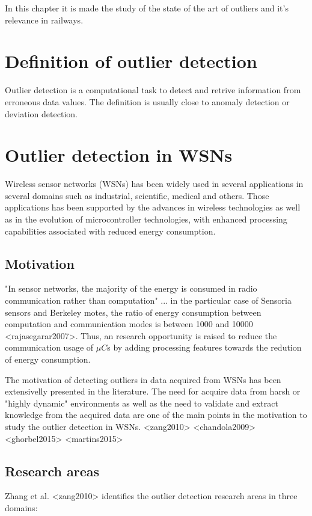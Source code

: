 In this chapter it is  made the study of the state of the art of outliers and it's relevance in railways.


\section{Definition of outlier detection}

Outlier detection is a computational task to detect and retrive information from erroneous data values. The definition is usually close to anomaly detection or deviation detection. 


\section{Outlier detection in WSNs}

Wireless sensor networks (WSNs) has been widely used in several applications in several domains such as industrial, scientific, medical and others. Those applications has been supported by the advances in wireless technologies as well as in the evolution of microcontroller technologies, with enhanced processing capabilities associated with reduced energy consumption.

\subsection{Motivation}

"In sensor networks, the majority of the energy is consumed in radio communication rather than computation" ... in the particular case of Sensoria sensors and Berkeley motes, the ratio of energy consumption between computation and communication modes is between 1000 and 10000 <rajasegarar2007>. Thus, an research opportunity is raised to reduce the communication usage of $\mu C$s by adding processing features towards the redution of energy consumption.

The motivation of detecting outliers in data acquired from WSNs has been extensivelly presented in the literature. The need for acquire data from harsh or "highly dynamic" environments as well as the need to validate and extract knowledge from the acquired data are one of the main points in the motivation to study the outlier detection in WSNs. <zang2010> <chandola2009> <ghorbel2015> <martins2015>  

\subsection{Research areas}
Zhang et al. <zang2010> identifies the outlier detection research areas in three domains: 

